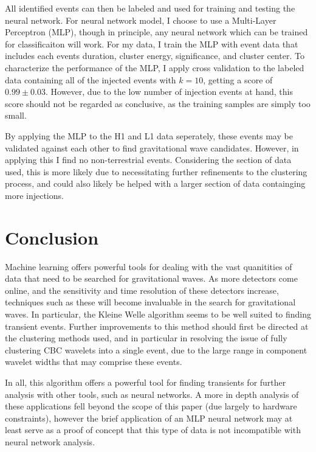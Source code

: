 \documentclass{article}
\begin{document}
All identified events can then be labeled and used for training and testing the neural network. For neural network model, I choose to use a Multi-Layer Perceptron (MLP), though in principle, any neural network which can be trained for classificaiton will work. For my data, I train the MLP with event data that includes each events duration, cluster energy, significance, and cluster center. To characterize the performance of the MLP, I apply cross validation to  the labeled data containing all of the injected events with $k=10$, getting a score of $0.99\pm0.03$. However, due to the low number of injection events at hand, this score should not be regarded as conclusive, as the training samples are simply too small.

By applying the MLP to the H1 and L1 data seperately, these events may be validated against each other to find gravitational wave candidates. However, in applying this I find no non-terrestrial events. Considering the section of data used, this is more likely due to necessitating further refinements to the clustering process, and could also likely be helped with a larger section of data containging more injections.

\section{Conclusion}
Machine learning offers powerful tools for dealing with the vast quanitities of data that need to be searched for gravitational waves. As more detectors come online, and the sensitivity and time resolution of these detectors increase, techniques such as these will become invaluable in the search for gravitational waves. In particular, the Kleine Welle algorithm seems to be well suited to finding transient events. Further improvements to this method should first be directed at the clustering methods used, and in particular in resolving the issue of fully clustering CBC wavelets into a single event, due to the large range in component wavelet widths that may comprise these events.

In all, this algorithm offers a powerful tool for finding transients for further analysis with other tools, such as neural networks. A more in depth analysis of these applications fell beyond the scope of this paper (due largely to hardware constraints), however the brief application of an MLP neural network may at least serve as a proof of concept that this type of data is not incompatible with neural network analysis.



\end{document}
